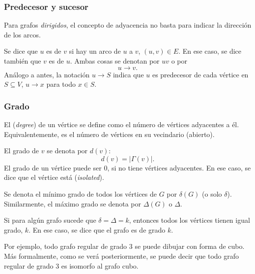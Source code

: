 \subsubsection{Predecesor y sucesor}
\label{sec:predecesor_sucesor}

Para grafos \emph{dirigidos}, el concepto de adyacencia no basta para indicar la dirección de los arcos.

Se dice que \(u\) es  de \(v\) si hay un arco de \(u\) a \(v\), \((u, v) \in E\). En ese caso, se dice también que \(v\) es  de \(u\). Ambas cosas se denotan por \(uv\) o por \[u \longrightarrow v.\]Análogo a antes, la notación \(u\longrightarrow S\) indica que \(u\) es predecesor de cada vértice en \(S\subseteq V\), \(u\longrightarrow x\) para todo \(x \in S\).

\subsubsection{Grado}
\label{sec:grado}

El  (\textit{degree}) de un vértice se define como el número de vértices adyacentes a él. Equivalentemente, es el número de vértices en su vecindario (abierto).

El grado de \(v\) se denota por \(d(v)\): \[d(v) = |\Gamma(v)|.\] El grado de un vértice puede ser 0, si no tiene vértices adyacentes. En ese caso, se dice que el vértice está  (\textit{isolated}).

Se denota el mínimo grado de todos los vértices de \(G\) por \(\delta(G)\) (o solo \(\delta\)). Similarmente, el máximo grado se denota por \(\Delta(G)\) o \(\Delta\).

Si para algún grafo sucede que \(\delta = \Delta = k\), entonces todos los vértices tienen igual grado, \(k\). En ese caso, se dice que el grafo es  de grado \(k\).

Por ejemplo, todo grafo regular de grado \(3\) se puede dibujar con forma de cubo. Más formalmente, como se verá posteriormente, se puede decir que todo grafo regular de grado \(3\) es isomorfo al grafo cubo.

